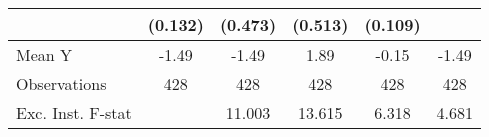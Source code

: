 {\begin{tabular}{l*{5}{c}}
            &     (0.132)         &     (0.473)         &     (0.513)         &     (0.109)         &                     \\
\midrule
Mean Y      &       -1.49         &       -1.49         &        1.89         &       -0.15         &       -1.49         \\
Observations&         428         &         428         &         428         &         428         &         428         \\
Exc. Inst. F-stat&                     &      11.003         &      13.615         &       6.318         &       4.681         \\
\bottomrule
\end{tabular}
}
